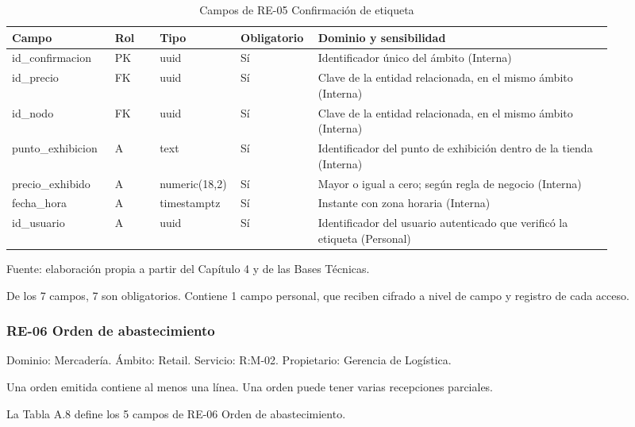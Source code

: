 \documentclass[11pt]{article}
\begin{document}
\begin{table}[htbp]
\caption{Campos de RE-05 Confirmación de etiqueta}\label{tab:d_re05}
\centering
\begin{tabular}{@{}p{0.167\linewidth}p{0.070\linewidth}p{0.079\linewidth}p{0.097\linewidth}p{0.465\linewidth}@{}}
\toprule Campo & Rol & Tipo & Obligatorio & Dominio y sensibilidad \\
\midrule
id\_confirmacion & PK & uuid & Sí & Identificador único del ámbito (Interna) \\
id\_precio & FK & uuid & Sí & Clave de la entidad relacionada, en el mismo ámbito (Interna) \\
id\_nodo & FK & uuid & Sí & Clave de la entidad relacionada, en el mismo ámbito (Interna) \\
punto\_exhibicion & A & text & Sí & Identificador del punto de exhibición dentro de la tienda (Interna) \\
precio\_exhibido & A & numeric(18,2) & Sí & Mayor o igual a cero; según regla de negocio (Interna) \\
fecha\_hora & A & timestamptz & Sí & Instante con zona horaria (Interna) \\
id\_usuario & A & uuid & Sí & Identificador del usuario autenticado que verificó la etiqueta (Personal) \\
\bottomrule
\end{tabular}
\par\smallskip
{\raggedright Fuente: elaboración propia a partir del Capítulo 4 y de las Bases Técnicas.\par}
\end{table}

De los 7 campos, 7 son obligatorios. Contiene 1 campo personal, que reciben cifrado a nivel de campo y registro de cada acceso.

\subsubsection{RE-06 Orden de abastecimiento}

Dominio: Mercadería. Ámbito: Retail. Servicio: R:M-02. Propietario: Gerencia de Logística.

Una orden emitida contiene al menos una línea. Una orden puede tener varias recepciones parciales.

La Tabla A.8 define los 5 campos de RE-06 Orden de abastecimiento.
\end{document}
